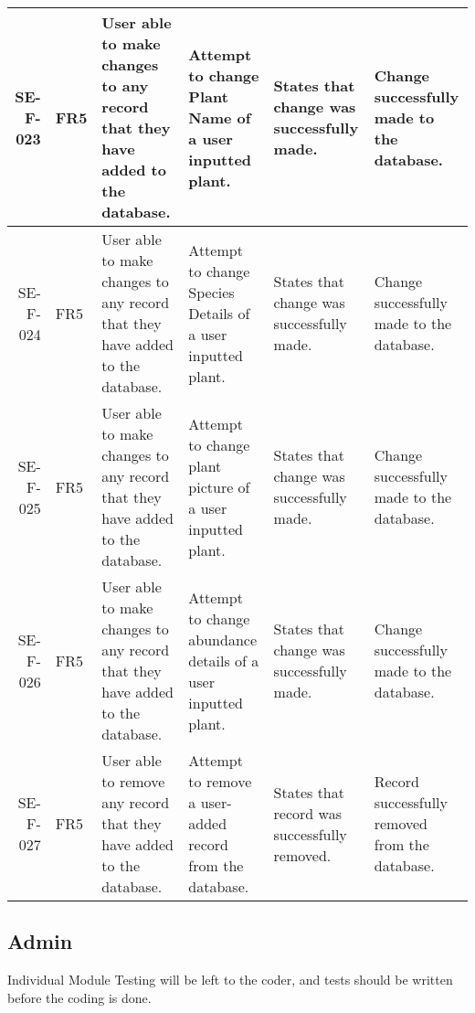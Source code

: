 \begin{landscape}
\begin{longtable}{|r|l|p{4cm}|p{4cm}|p{4cm}|p{4cm}|}
		SE-F-023 & FR5 & User able to make changes to any record that they have added to the database. & Attempt to change Plant Name of a user inputted plant. & States that change was successfully made. & Change successfully made to the database. \\ \hline
		SE-F-024 & FR5 & User able to make changes to any record that they have added to the database. & Attempt to change Species Details of a user inputted plant. & States that change was successfully made. & Change successfully made to the database. \\ \hline
		SE-F-025 & FR5 & User able to make changes to any record that they have added to the database. & Attempt to change plant picture of a user inputted plant. & States that change was successfully made. & Change successfully made to the database. \\ \hline
		SE-F-026 & FR5 & User able to make changes to any record that they have added to the database. & Attempt to change abundance details of a user inputted plant. & States that change was successfully made. & Change successfully made to the database. \\ \hline
		SE-F-027 & FR5 & User able to remove any record that they have added to the database. & Attempt to remove a user-added record from the database. & States that record was successfully removed. & Record successfully removed from the database. \\ \hline
		\end{longtable}
	\end{landscape}

\subsection{Admin}
	Individual Module Testing will be left to the coder, and tests should be written before the coding is done.


